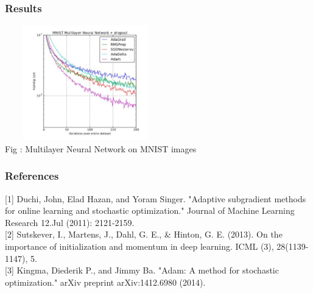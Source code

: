 \documentclass{beamer}
\begin{document}
\begin{frame}
 \frametitle{Results}
 \begin{center}
 \includegraphics[width=7cm,height=5cm,angle=0]{mlp} \\
 Fig : Multilayer Neural Network on MNIST images
 \end{center}


\end{frame}

\begin{frame}
\frametitle{References}
[1] Duchi, John, Elad Hazan, and Yoram Singer. "Adaptive subgradient methods for online learning and stochastic optimization." Journal of Machine Learning Research 12.Jul (2011): 2121-2159. \\

[2] Sutskever, I., Martens, J., Dahl, G. E., & Hinton, G. E. (2013). On the importance of initialization and momentum in deep learning. ICML (3), 28(1139-1147), 5. \\

[3] Kingma, Diederik P., and Jimmy Ba. "Adam: A method for stochastic optimization." arXiv preprint arXiv:1412.6980 (2014).

\end{frame}
\end{document}
